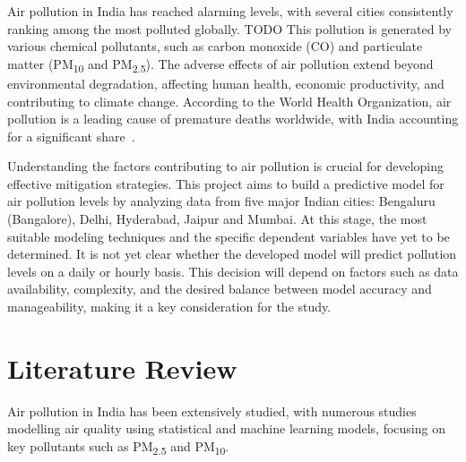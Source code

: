 \documentclass[12pt]{article}
\begin{document}
Air pollution in India has reached alarming levels, with several cities consistently ranking among the most polluted globally. TODO This pollution is generated by various chemical pollutants, such as carbon monoxide (CO) and particulate matter (PM\textsubscript{10} and PM\textsubscript{2.5}). The adverse effects of air pollution extend beyond environmental degradation, affecting human health, economic productivity, and contributing to climate change. According to the World Health Organization, air pollution is a leading cause of premature deaths worldwide, with India accounting for a significant share~\cite{Dey2020}.

Understanding the factors contributing to air pollution is crucial for developing effective mitigation strategies. This project aims to build a predictive model for air pollution levels by analyzing data from five major Indian cities: Bengaluru (Bangalore), Delhi, Hyderabad, Jaipur and Mumbai. At this stage, the most suitable modeling techniques and the specific dependent variables have yet to be determined. It is not yet clear whether the developed model will predict pollution levels on a daily or hourly basis. This decision will depend on factors such as data availability, complexity, and the desired balance between model accuracy and manageability, making it a key consideration for the study.

\newpage




\section{Literature Review}

Air pollution in India has been extensively studied, with numerous studies modelling air quality using statistical and machine learning models, focusing on key pollutants such as PM\textsubscript{2.5} and PM\textsubscript{10}.


\end{document}
